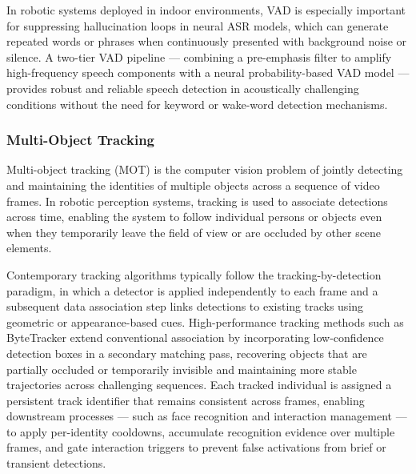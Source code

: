 In robotic systems deployed in indoor environments, VAD is especially important for suppressing hallucination loops in neural ASR models, which can generate repeated words or phrases when continuously presented with background noise or silence. A two-tier VAD pipeline — combining a pre-emphasis filter to amplify high-frequency speech components with a neural probability-based VAD model — provides robust and reliable speech detection in acoustically challenging conditions without the need for keyword or wake-word detection mechanisms.

\subsubsection{Multi-Object Tracking}

Multi-object tracking (MOT) is the computer vision problem of jointly detecting and maintaining the identities of multiple objects across a sequence of video frames. In robotic perception systems, tracking is used to associate detections across time, enabling the system to follow individual persons or objects even when they temporarily leave the field of view or are occluded by other scene elements.

Contemporary tracking algorithms typically follow the tracking-by-detection paradigm, in which a detector is applied independently to each frame and a subsequent data association step links detections to existing tracks using geometric or appearance-based cues. High-performance tracking methods such as ByteTracker extend conventional association by incorporating low-confidence detection boxes in a secondary matching pass, recovering objects that are partially occluded or temporarily invisible and maintaining more stable trajectories across challenging sequences. Each tracked individual is assigned a persistent track identifier that remains consistent across frames, enabling downstream processes — such as face recognition and interaction management — to apply per-identity cooldowns, accumulate recognition evidence over multiple frames, and gate interaction triggers to prevent false activations from brief or transient detections.
